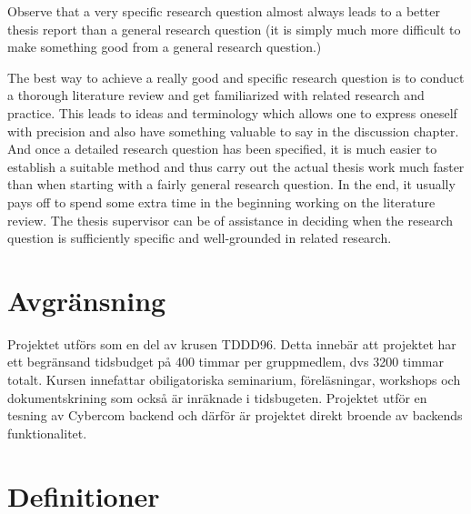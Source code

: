 Observe that a very specific research question almost always
leads to a better thesis report than a general research question
(it is simply much more difficult to make something good
from a general research question.)

The best way to achieve a really good and specific research
question is to conduct a thorough literature review and get
familiarized with related research and practice. This leads to
ideas and terminology which allows one to express oneself
with precision and also have something valuable to say in the
discussion chapter. And once a detailed research question
has been specified, it is much easier to establish a suitable
method and thus carry out the actual thesis work much faster
than when starting with a fairly general research question. In
the end, it usually pays off to spend some extra time in the
beginning working on the literature review. The thesis
supervisor can be of assistance in deciding when the research
question is sufficiently specific and well-grounded in related
research.

\section{Avgränsning}
\label{sec:delimitations}

Projektet utförs som en del av krusen TDDD96. Detta innebär att projektet har ett begränsand tidsbudget på 400 timmar
per gruppmedlem, dvs 3200 timmar totalt. Kursen innefattar obiligatoriska seminarium, föreläsningar, workshops och dokumentskrining som också är inräknade i tidsbugeten. 
Projektet utför en tesning av Cybercom backend och därför är projektet direkt broende av backends funktionalitet.  

\section{Definitioner} %
\label{sec:definitions}
\begin{enumerate}[leftmargin=5cm]
\end{enumerate}
